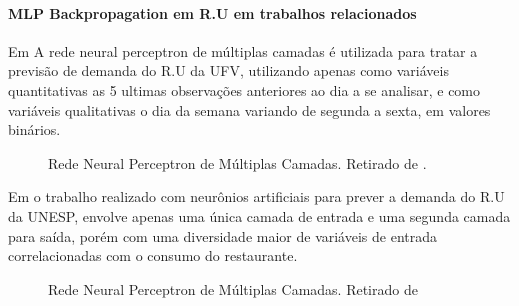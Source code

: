 \documentclass[	12pt, Times, openright, twoside, a4paper, english, brazil]{abntex2}
\begin{document}
  	       \paragraph*{MLP Backpropagation em R.U em trabalhos relacionados}
  	       Em \cite{Lopes2008} A rede neural perceptron de múltiplas camadas é utilizada para tratar a previsão de demanda do R.U da UFV, utilizando apenas como variáveis quantitativas as 5 ultimas observações anteriores ao dia a se analisar, e como variáveis qualitativas o dia da semana variando de segunda a sexta, em valores binários.
  	       
           \begin{figure}[!ht]
          	\caption{Rede Neural Perceptron de Múltiplas Camadas. Retirado de \cite{Lopes2008}.\label{fig:Rna-Perceptron-MultiLayer}}
           \end{figure}
            
           Em \cite{Rocha2011} o trabalho realizado com neurônios artificiais para prever a demanda do R.U da UNESP, envolve apenas uma única camada de entrada e uma segunda camada para saída, porém com uma diversidade maior de variáveis de entrada correlacionadas com o consumo do restaurante. 
           \begin{figure}[!ht]
          	\caption{Rede Neural Perceptron de Múltiplas Camadas. Retirado de  \cite{Rocha2011} \label{fig:rnaRocha}}
           \end{figure}
         
\end{document}
